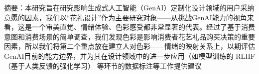 摘要：本研究旨在研究影响生成式人工智能（GenAI）定制化设计领域的用户采纳意愿的因素，我们以“花礼设计”作为主要研究对象——从挑战GenAI能力的视角来看，这是一个审美直觉、情绪体验、色彩感受都非常显著的代表。经过了基于消费意图和消费场景的简单调查，我们发现色彩是影响消费者花艺礼品购买决策的重要因素，所以我们将第二个重点放在建立人对色彩——情绪的映射关系上，以期评估GenAI目前的能力边界，并为其在设计领域中的进一步应用（如模型训练的 RLHF（基于人类反馈的强化学习） 等环节的数据标注等工作提供建议
